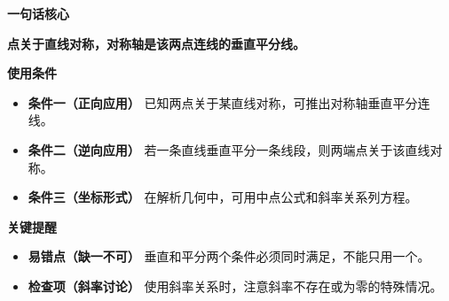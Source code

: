 \begin{summarybox}
	\textbf{\textcolor{CSummary}{一句话核心}}

	\textbf{点关于直线对称，对称轴是该两点连线的垂直平分线。}

	\medskip
	\textbf{\textcolor{CSummary}{使用条件}}
	\begin{itemize}[leftmargin=*, itemsep=0.5em, topsep=0.4em]
		\item \textbf{条件一（正向应用）} 已知两点关于某直线对称，可推出对称轴垂直平分连线。
		\item \textbf{条件二（逆向应用）} 若一条直线垂直平分一条线段，则两端点关于该直线对称。
		\item \textbf{条件三（坐标形式）} 在解析几何中，可用中点公式和斜率关系列方程。
	\end{itemize}

	\medskip
	\textbf{\textcolor{CSummary}{关键提醒}}
	\begin{itemize}[leftmargin=*, itemsep=0.5em, topsep=0.4em]
		\item \textbf{易错点（缺一不可）} 垂直和平分两个条件必须同时满足，不能只用一个。
		\item \textbf{检查项（斜率讨论）} 使用斜率关系时，注意斜率不存在或为零的特殊情况。
	\end{itemize}
\end{summarybox}
